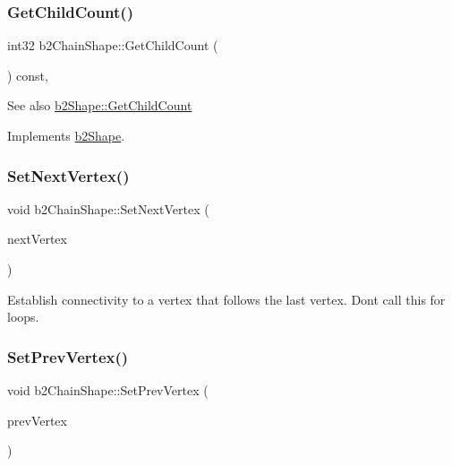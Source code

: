 \subsubsection{\texorpdfstring{Get\+Child\+Count()}{GetChildCount()}}
{\footnotesize\ttfamily int32 b2\+Chain\+Shape\+::\+Get\+Child\+Count (\begin{DoxyParamCaption}{ }\end{DoxyParamCaption}) const\hspace{0.3cm}{\ttfamily [override]}, {\ttfamily [virtual]}}

\begin{DoxySeeAlso}{See also}
\hyperlink{classb2_shape_a05a3c445017d96df9238ceefe6ce37ab}{b2\+Shape\+::\+Get\+Child\+Count} 
\end{DoxySeeAlso}


Implements \hyperlink{classb2_shape_a05a3c445017d96df9238ceefe6ce37ab}{b2\+Shape}.

\mbox{\label{classb2_chain_shape_a15c7c2821a52266ef57621ac7d34a95f}} 
\subsubsection{\texorpdfstring{Set\+Next\+Vertex()}{SetNextVertex()}}
{\footnotesize\ttfamily void b2\+Chain\+Shape\+::\+Set\+Next\+Vertex (\begin{DoxyParamCaption}\item[{const \hyperlink{structb2_vec2}{b2\+Vec2} \&}]{next\+Vertex }\end{DoxyParamCaption})}

Establish connectivity to a vertex that follows the last vertex. Don\textquotesingle{}t call this for loops. \mbox{\label{classb2_chain_shape_aeb2ddbe0c52a98885e91b7c8f597315b}} 
\subsubsection{\texorpdfstring{Set\+Prev\+Vertex()}{SetPrevVertex()}}
{\footnotesize\ttfamily void b2\+Chain\+Shape\+::\+Set\+Prev\+Vertex (\begin{DoxyParamCaption}\item[{const \hyperlink{structb2_vec2}{b2\+Vec2} \&}]{prev\+Vertex }\end{DoxyParamCaption})}

